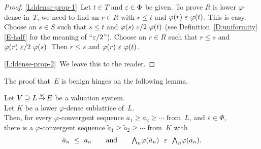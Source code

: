 \documentclass[main.tex]{subfiles}
\begin{document}
\begin{proof}
\noindent\ref{L:ldense-prop-1}\ 
Let $t\in T$ and $\varepsilon \in\Phi$ be given.
To prove $R$ is lower $\varphi$-dense in~$T$,
we need to find an $r\in R$
with $r\leq t$ and $\varphi(r) \ \varepsilon\ \varphi(t)$.
This is easy.
Choose an $s\in S$
such that $s \leq t$ and $\varphi(s)\ \varepsilon/2\ \varphi(t)$
(see Definition~\ref{D:uniformity}\ref{E-half}
for the meaning of ``$\varepsilon/2$'').
Choose an $r\in R$
such that $r\leq s$ and $\varphi(r)\ \varepsilon/2\ \varphi(s)$.
Then $r\leq s$ and $\varphi(r) \ \varepsilon\ \varphi(t)$.
\vspace{.3em}

\noindent\ref{L:ldense-prop-2}\ 
We leave this to the reader.
\end{proof}
%
%
%
%
The proof that~$E$
 is benign
hinges on the following lemma.
\begin{lem}
\label{lem:main}
Let $V \supseteq L\,\smash{\stackrel{\varphi}{\rightarrow}}\,E$ be a valuation system.\\
Let $K$ be a lower $\varphi$-dense sublattice of~$L$.\\
Then, for every $\varphi$-convergent sequence
 $a_1 \geq a_2 \geq \dotsb$ from~$L$,
and $\varepsilon\in \Phi$,\\
there is a $\varphi$-convergent sequence
$\tilde a_1 \geq \tilde a_2 \geq \dotsb$ from~$K$
with 
\begin{equation}
\label{eq:main}
\tilde a_n \ \leq\  a_n
\qquad\text{and}\qquad
\textstyle{\bigwedge}_n \varphi (\tilde a_n) \ \ \varepsilon\ \ \textstyle{\bigwedge}_n\varphi (a_n).
\end{equation}
\end{lem}
\end{document}
